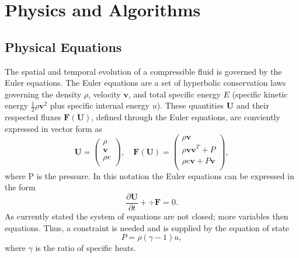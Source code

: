 \section{Physics and Algorithms}
\subsection{Physical Equations}
\label{sec.physical_eq}
The spatial and temporal evolution of a compressible fluid is governed by the Euler equations.
The Euler equations are a set of hyperbolic conservation laws governing the density $\rho$,
velocity $\mathbf{v}$, and total specific energy $E$ (specific kinetic energy
$\frac{1}{2}\rho \mathbf{v}^2$ plus specific internal energy $u$). These quantities $\mathbf{U}$
and their respected fluxes $\mathbf{F}(\mathbf{U})$, defined through the Euler equations, are
conviently expressed in vector form as
%
\begin{equation}
    \mathbf{U} =
    \left(
    \begin{array}{c}
        \rho \\
        \mathbf{v} \\
        \rho e \\
    \end{array} \right),
    \quad
    \mathbf{F}(\mathbf{U}) =
    \left(
    \begin{array}{c}
        \rho\mathbf{v} \\
        \rho\mathbf{v}\mathbf{v}^T + P \\
        \rho e\mathbf{v} + P\mathbf{v} \\
    \end{array}
    \right),
\end{equation}
%
where P is the pressure. In this notation the Euler equations can be expressed in the form
%
\begin{equation}
    \label{eq.euler}
    \frac{\partial \mathbf{U}}{\partial t} + \div \mathbf{F} = 0.
\end{equation}
%
As currently stated the system of equations are not closed; more variables then equations. Thus,
a constraint is needed and is supplied by the equation of state
%
\begin{equation}
    P = \rho(\gamma - 1)u,
\end{equation}
%
where $\gamma$ is the ratio of specific heats.

